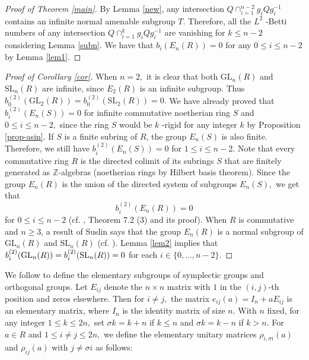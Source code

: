 \documentclass{gtpart}     %
\begin{document}
\begin{proof}[Proof of Theorem \protect\ref{main}]
By Lemma \ref{new}, any intersection $Q\cap _{i=1}^{n-2}g_{i}Qg_{i}^{-1}$
contains an infinite normal amenable subgroup $T.$ Therefore, all the $L^{2}$%
-Betti numbers of any intersection $Q\cap _{i=1}^{k}g_{i}Qg_{i}^{-1}$ are
vanishing for $k\leq n-2$ considering Lemma \ref{subn}. We have that $%
b_{i}(E_{n}(R))=0$ for any $0\leq i\leq n-2$ by Lemma \ref{lem1}.
\end{proof}

\bigskip

\begin{proof}[Proof of Corollary \protect\ref{cor}]
When $n=2,$ it is clear that both $\mathrm{GL}_{n}(R)$ and $\mathrm{SL}%
_{n}(R)$ are infinite, since $E_{2}(R)$ is an infinite subgroup. Thus $%
b_{0}^{(2)}(\mathrm{GL}_{2}(R))=b_{0}^{(2)}(\mathrm{SL}_{2}(R))=0.$ We have
already proved that $b_{i}^{(2)}(E_{n}(S))=0$ for infinite commutative
noetherian ring $S$ and $0\leq i\leq n-2,$ since the ring $S$ would be $k$%
-rigid for any integer $k$ by Proposition \ref{prop-asin}. If $S$ is a
finite subring of $R$, the group $E_{n}(S)$ is also finite. Therefore, we
still have $b_{i}^{(2)}(E_{n}(S))=0$ for $1\leq i\leq n-2.$ Note that every
commutative ring $R$ is the directed colimit of its subrings $S$ that are
finitely generated as $\mathbb{Z}$-algebras (noetherian rings by Hilbert
basis theorem). Since the group $E_{n}(R)$ is the union of the directed
system of subgroups $E_{n}(S),$ we get that
\begin{equation*}
b_{i}^{(2)}(E_{n}(R))=0
\end{equation*}%
for $0\leq i\leq n-2$ (cf. \cite{lu}, Theorem 7.2 (3) and its proof)$.$ When
$R$ is commutative and $n\geq 3$, a result of Suslin says that the group $%
E_{n}(R)$ is a normal subgroup of $\mathrm{GL}_{n}(R)$ and $\mathrm{SL}%
_{n}(R)$ (cf. \cite{Su}). Lemma \ref{lem2} implies that $b_{i}^{(2)}(\mathrm{%
GL}_{n}(R))=b_{i}^{(2)}(\mathrm{SL}_{n}(R))=0$ for each $i\in \{0,\ldots
,n-2\}.$
\end{proof}

\bigskip

We follow \cite{bak} to define the elementary subgroups of symplectic groups
and orthogonal groups. Let $E_{ij}$ denote the $n\times n$ matrix with $1$
in the $(i,j)$-th position and zeros elsewhere. Then for $i\neq j,$ the
matrix $e_{ij}(a)=I_{n}+aE_{ij}$ is an elementary matrix, where $I_{n}$ is
the identity matrix of size $n$. With $n$ fixed, for any integer $1\leq
k\leq 2n,$ set $\sigma k=k+n$ if $k\leq n$ and $\sigma k=k-n$ if $k>n$. For $%
a\in R$ and $1\leq i\neq j\leq 2n,$ we define the elementary unitary
matrices $\rho _{i,\sigma i}(a)$ and $\rho _{ij}(a)$ with $j\neq \sigma i$
as follows:
\end{document}
